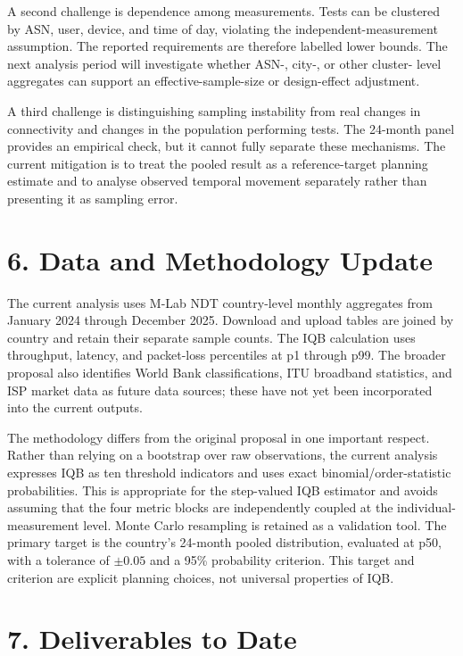 \documentclass[11pt]{article}
\begin{document}
A second challenge is dependence among measurements. Tests can be clustered by ASN, user, device, and
time of day, violating the independent-measurement assumption. The reported requirements are therefore
labelled lower bounds. The next analysis period will investigate whether ASN-, city-, or other cluster-
level aggregates can support an effective-sample-size or design-effect adjustment.

A third challenge is distinguishing sampling instability from real changes in connectivity and changes
in the population performing tests. The 24-month panel provides an empirical check, but it cannot fully
separate these mechanisms. The current mitigation is to treat the pooled result as a reference-target
planning estimate and to analyse observed temporal movement separately rather than presenting it as
sampling error.

\section*{6. Data and Methodology Update}

The current analysis uses M-Lab NDT country-level monthly aggregates from January 2024 through December
2025. Download and upload tables are joined by country and retain their separate sample counts. The IQB
calculation uses throughput, latency, and packet-loss percentiles at p1 through p99. The broader proposal
also identifies World Bank classifications, ITU broadband statistics, and ISP market data as future data
sources; these have not yet been incorporated into the current outputs.

The methodology differs from the original proposal in one important respect. Rather than relying on a
bootstrap over raw observations, the current analysis expresses IQB as ten threshold indicators and
uses exact binomial/order-statistic probabilities. This is appropriate for the step-valued IQB estimator
and avoids assuming that the four metric blocks are independently coupled at the individual-measurement
level. Monte Carlo resampling is retained as a validation tool. The primary target is the country's
24-month pooled distribution, evaluated at p50, with a tolerance of $\pm0.05$ and a 95\% probability
criterion. This target and criterion are explicit planning choices, not universal properties of IQB.

\section*{7. Deliverables to Date}
\end{document}
